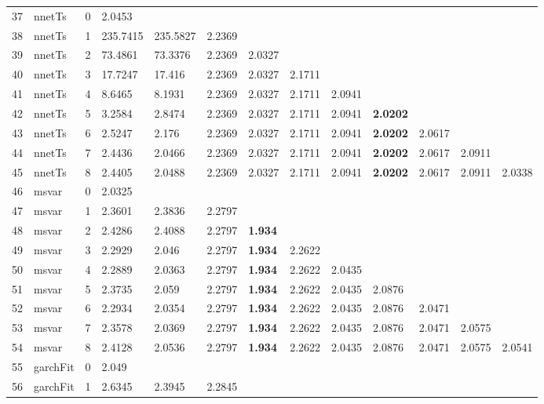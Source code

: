 \documentclass[10pt,a4paper]{article}
\begin{document}
\begin{table}[ht]
\begin{tabular}{rlrllllllllll}
37 & nnetTs &     0 & 2.0453 &  &  &  &  &  &  &  &  &  \\ 
  38 & nnetTs &     1 & 235.7415 & 235.5827 & 2.2369 &  &  &  &  &  &  &  \\ 
  39 & nnetTs &     2 & 73.4861 & 73.3376 & 2.2369 & 2.0327 &  &  &  &  &  &  \\ 
  40 & nnetTs &     3 & 17.7247 & 17.416 & 2.2369 & 2.0327 & 2.1711 &  &  &  &  &  \\ 
  41 & nnetTs &     4 & 8.6465 & 8.1931 & 2.2369 & 2.0327 & 2.1711 & 2.0941 &  &  &  &  \\ 
  42 & nnetTs &     5 & 3.2584 & 2.8474 & 2.2369 & 2.0327 & 2.1711 & 2.0941 & \textbf{2.0202} &  &  &  \\ 
  43 & nnetTs &     6 & 2.5247 & 2.176 & 2.2369 & 2.0327 & 2.1711 & 2.0941 & \textbf{2.0202} & 2.0617 &  &  \\ 
  44 & nnetTs &     7 & 2.4436 & 2.0466 & 2.2369 & 2.0327 & 2.1711 & 2.0941 & \textbf{2.0202} & 2.0617 & 2.0911 &  \\ 
  45 & nnetTs &     8 & 2.4405 & 2.0488 & 2.2369 & 2.0327 & 2.1711 & 2.0941 & \textbf{2.0202} & 2.0617 & 2.0911 & 2.0338 \\ 
   \hline
46 & msvar &     0 & 2.0325 &  &  &  &  &  &  &  &  &  \\ 
  47 & msvar &     1 & 2.3601 & 2.3836 & 2.2797 &  &  &  &  &  &  &  \\ 
  48 & msvar &     2 & 2.4286 & 2.4088 & 2.2797 & \textbf{1.934} &  &  &  &  &  &  \\ 
  49 & msvar &     3 & 2.2929 & 2.046 & 2.2797 & \textbf{1.934} & 2.2622 &  &  &  &  &  \\ 
  50 & msvar &     4 & 2.2889 & 2.0363 & 2.2797 & \textbf{1.934} & 2.2622 & 2.0435 &  &  &  &  \\ 
  51 & msvar &     5 & 2.3735 & 2.059 & 2.2797 & \textbf{1.934} & 2.2622 & 2.0435 & 2.0876 &  &  &  \\ 
  52 & msvar &     6 & 2.2934 & 2.0354 & 2.2797 & \textbf{1.934} & 2.2622 & 2.0435 & 2.0876 & 2.0471 &  &  \\ 
  53 & msvar &     7 & 2.3578 & 2.0369 & 2.2797 & \textbf{1.934} & 2.2622 & 2.0435 & 2.0876 & 2.0471 & 2.0575 &  \\ 
  54 & msvar &     8 & 2.4128 & 2.0536 & 2.2797 & \textbf{1.934} & 2.2622 & 2.0435 & 2.0876 & 2.0471 & 2.0575 & 2.0541 \\ 
   \hline
55 & garchFit &     0 & 2.049 &  &  &  &  &  &  &  &  &  \\ 
  56 & garchFit &     1 & 2.6345 & 2.3945 & 2.2845 &  &  &  &  &  &  &  \\ 

\end{tabular}
\end{table}
\end{document}
